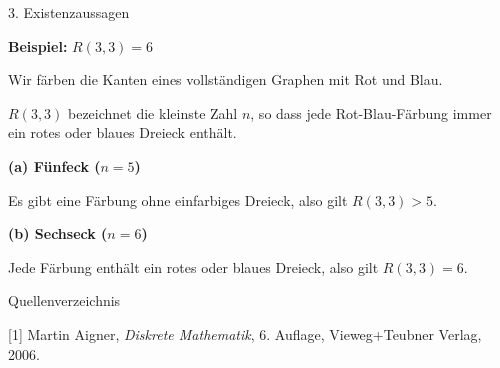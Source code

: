 \documentclass{beamer}
\begin{document}
\begin{frame}{3. Existenzaussagen}

\textbf{Beispiel:} \(R(3,3)=6\)

\medskip

Wir färben die Kanten eines vollständigen Graphen
mit Rot und Blau.

\medskip

\(R(3,3)\) bezeichnet die kleinste Zahl \(n\), so dass
jede Rot-Blau-Färbung immer ein rotes oder blaues Dreieck enthält.

\medskip

\textbf{(a) Fünfeck (\(n=5\))}

Es gibt eine Färbung ohne einfarbiges Dreieck,
also gilt \(R(3,3)>5\).

\medskip

\textbf{(b) Sechseck (\(n=6\))}

Jede Färbung enthält ein rotes oder blaues Dreieck,
also gilt \(R(3,3)=6\).

\end{frame}

\begin{frame}{Quellenverzeichnis}

[1] Martin Aigner, \textit{Diskrete Mathematik}, 6. Auflage, Vieweg+Teubner Verlag, 2006.

\end{frame}
\end{document}
